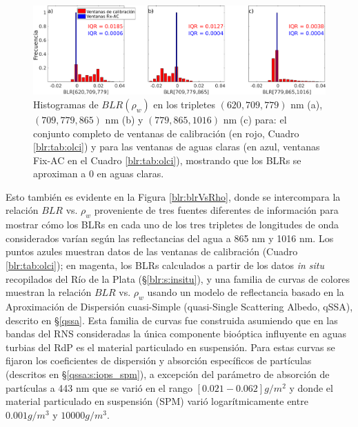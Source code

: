         \begin{figure}
        \centering
        \includegraphics[width=\textwidth]{blr/figures/blrHistClearVsTurbid}
        \caption[Histogramas de $BLR(\rho_{w})$ en los tripletes $(620,709,779)$ nm (a), $(709,779,865)$ nm (b) y $(779,865,1016)$ nm (c) para el conjunto completo de ventanas de calibración y para las ventanas de aguas claras.]{Histogramas de $BLR(\rho_{w})$ en los tripletes $(620,709,779)$ nm (a), $(709,779,865)$ nm (b) y $(779,865,1016)$ nm (c) para: el conjunto completo de ventanas de calibración (en rojo, Cuadro \ref{blr:tab:olci}) y para las ventanas de aguas claras (en azul, ventanas Fix-AC en el Cuadro \ref{blr:tab:olci}), mostrando que los BLRs se aproximan a 0 en aguas claras.}
        \label{blr:blrHist}
        \end{figure}
        
        Esto también es evidente en la Figura \ref{blr:blrVsRho}, donde se intercompara la relación $BLR$ vs. $\rho_{w}$ proveniente de tres fuentes diferentes de información para mostrar cómo los BLRs en cada uno de los tres tripletes de longitudes de onda considerados varían según las reflectancias del agua a 865 nm y 1016 nm. Los puntos azules muestran datos de las ventanas de calibración (Cuadro \ref{blr:tab:olci}); en magenta, los BLRs calculados a partir de los datos \textit{in situ} recopilados del Río de la Plata (\S \ref{blr:s:insitu}), y una familia de curvas de colores muestran la relación $BLR$ vs. $\rho_{w}$ usando un modelo de reflectancia basado en la Aproximación de Dispersión cuasi-Simple (quasi-Single Scattering Albedo, qSSA), descrito en \S \ref{qssa}. Esta familia de curvas fue construida asumiendo que en las bandas del RNS consideradas la única componente bioóptica influyente en aguas turbias del RdP es el material particulado en suspensión. Para estas curvas se fijaron los coeficientes de dispersión y absorción específicos de partículas (descritos en \S \ref{qssa:s:iops_spm}), a excepción del parámetro de absorción de partículas a 443 nm que se varió en el rango $[0.021-0.062]g/m^{2}$ y donde el material particulado en suspensión (SPM) varió logarítmicamente entre $0.001 g/m^{3}$ y $10000 g/m^{3}$.

